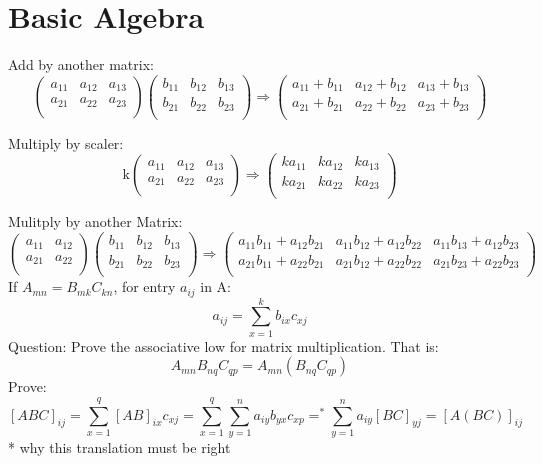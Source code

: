 \documentclass[a4paper,10pt]{article}
\begin{document}
\section{Basic Algebra}
Add by another matrix:
\begin{equation}
 \begin{pmatrix}
 a_{11} & a_{12} & a_{13} \\
 a_{21} & a_{22} & a_{23} \\
\end{pmatrix}
\begin{pmatrix}
 b_{11} & b_{12} & b_{13} \\
 b_{21} & b_{22} & b_{23} \\
\end{pmatrix}
\Rightarrow
\begin{pmatrix}
 a_{11} + b_{11} & a_{12} + b_{12} & a_{13} + b_{13} \\
 a_{21} + b_{21} & a_{22} + b_{22} & a_{23} + b_{23} \\
\end{pmatrix}
\end{equation}

Multiply by scaler:
\begin{equation}
 \text{k}\begin{pmatrix}
 a_{11} & a_{12} & a_{13} \\
 a_{21} & a_{22} & a_{23} \\
\end{pmatrix}
\Rightarrow
\begin{pmatrix}
 ka_{11} & ka_{12} & ka_{13} \\
 ka_{21} & ka_{22} & ka_{23} \\
\end{pmatrix}
\end{equation}

Mulitply by another Matrix:
\begin{equation}
 \begin{pmatrix}
 a_{11} & a_{12} \\
 a_{21} & a_{22} \\
\end{pmatrix}
\begin{pmatrix}
 b_{11} & b_{12} & b_{13} \\
 b_{21} & b_{22} & b_{23} \\
\end{pmatrix}
\Rightarrow
\begin{pmatrix}
 a_{11}b_{11} + a_{12} b_{21} & a_{11}b_{12} + a_{12}b_{22} & a_{11}b_{13} + a_{12}b_{23} \\
 a_{21}b_{11} + a_{22} b_{21} & a_{21}b_{12} + a_{22}b_{22} & a_{21}b_{23} + a_{22}b_{23}  \\
\end{pmatrix}
\end{equation}
If $A_{mn} = B_{mk}C_{kn}$, for entry $a_{ij}$ in A:
\[
	a_{ij} = \sum_{x=1}^k b_{ix}c_{xj}
\]
Question: Prove the associative low for matrix multiplication. That is:$$A_{mn}B_{nq}C_{qp} = A_{mn}(B_{nq}C_{qp})$$
Prove:$$[ABC]_{ij} = \sum_{x=1}^q [AB]_{ix}c_{xj} = \sum_{x=1}^q \sum_{y=1}^n a_{iy}b_{yx}c_{xp} =^* \sum_{y=1}^n a_{iy}[BC]_{yj} = [A(BC)]_{ij}$$
* why this translation must be right
\end{document}
